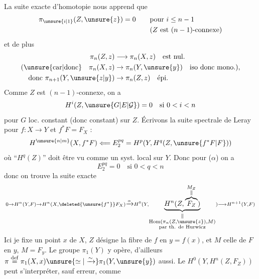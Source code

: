 La suite exacte d'homotopie nous  apprend que
\[
\begin{aligned}
\pi_{\unsure{i|1}}(Z,\unsure{z})=0&\qquad\text{pour }i\leq n-1\\
&\qquad(Z\ \text{est }(n-1)\text{-connexe})
\end{aligned}
\]
et de plus
\[
\begin{aligned}
\pi_n(Z,z)&\longrightarrow\pi_n(X,z)\quad\text{est nul.}\\
\text{(\unsure{car|donc}}\quad\pi_n(X,z)&\to\pi_n(Y,\unsure{y})\quad\text{iso donc mono.)},\\
\text{donc }\pi_{n+1}(Y,\unsure{z|y})&\to\pi_n(Z,z)\quad\text{épi}.
\end{aligned}
\]
Comme $Z$ est $(n-1)$-connexe,  on a
\[
H^i(Z,\unsure{G|E|\mathcal G})=0\quad\text{si }0<i<n
\]
pour $G$ loc. constant (donc constant) sur $Z$.
Écrivons la suite spectrale de Leray pour $f:X\to Y$ et $f^*F=F_X$ :
\[
H^{\unsure{n|m}}(X,f^*F)\Longleftarrow E^{pq}_2=H^p(Y,H^q(Z,\unsure{f^*F|F}))
\]
où ``$H^q(Z)$'' doit être vu comme un syst. local sur $Y$. Donc pour ($\alpha$) on a
\[
E^{pq}_2=0\quad\text{si }0<q<n
\]
donc on trouve la suite exacte
\[
\scriptstyle 0\to H^n(Y,F)\to H^n(X,\deleted{\unsure{f^*}}F_X)
\xrightarrow{\alpha}H^0(Y,\underbrace{H^n(Z,\overbrace{F_Z}^{\substack{M_Z\\\Vert}})}_{\substack{\Vert\\\mathrm{Hom}(\pi_n(Z,\unsure{z}),M)\\\text{par th. de Hurwicz}}})\longrightarrow H^{n+1}(Y,F)
\]
Ici  je fixe un point $x$ de $X$, $Z$ désigne la fibre de $f$ en $y=f(x)$, et $M$ celle de $F$ en $y$, $M=F_y$. Le groupe $\pi_1(Y)$ y opère, d'ailleurs $\pi\overset{\mathrm{def}}{=}\pi_1(X,x)\unsure{\simeq|\xrightarrow{\sim}}\pi_1(Y,\unsure{y})$ aussi. Le $H^0(Y,H^n(Z,F_Z))$ peut s'interpréter, sauf erreur, comme
